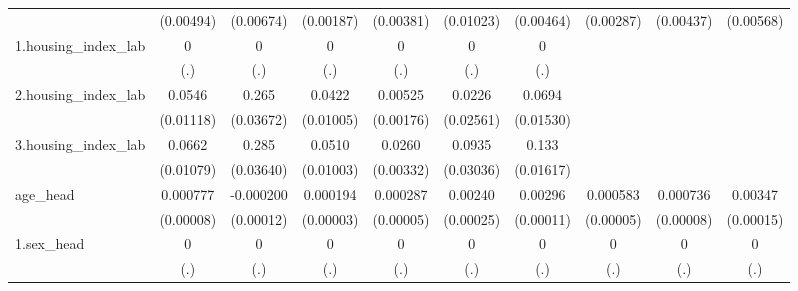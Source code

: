 \begin{table}[htbp]
\begin{tabular}{l*{9}{c}}
            &   (0.00494)         &   (0.00674)         &   (0.00187)         &   (0.00381)         &   (0.01023)         &   (0.00464)         &   (0.00287)         &   (0.00437)         &   (0.00568)         \\
1.housing\_index\_lab&           0         &           0         &           0         &           0         &           0         &           0         &                     &                     &                     \\
            &         (.)         &         (.)         &         (.)         &         (.)         &         (.)         &         (.)         &                     &                     &                     \\
2.housing\_index\_lab&      0.0546\sym{***}&       0.265\sym{***}&      0.0422\sym{***}&     0.00525\sym{***}&      0.0226         &      0.0694\sym{***}&                     &                     &                     \\
            &   (0.01118)         &   (0.03672)         &   (0.01005)         &   (0.00176)         &   (0.02561)         &   (0.01530)         &                     &                     &                     \\
3.housing\_index\_lab&      0.0662\sym{***}&       0.285\sym{***}&      0.0510\sym{***}&      0.0260\sym{***}&      0.0935\sym{***}&       0.133\sym{***}&                     &                     &                     \\
            &   (0.01079)         &   (0.03640)         &   (0.01003)         &   (0.00332)         &   (0.03036)         &   (0.01617)         &                     &                     &                     \\
age\_head    &    0.000777\sym{***}&   -0.000200\sym{*}  &    0.000194\sym{***}&    0.000287\sym{***}&     0.00240\sym{***}&     0.00296\sym{***}&    0.000583\sym{***}&    0.000736\sym{***}&     0.00347\sym{***}\\
            &   (0.00008)         &   (0.00012)         &   (0.00003)         &   (0.00005)         &   (0.00025)         &   (0.00011)         &   (0.00005)         &   (0.00008)         &   (0.00015)         \\
1.sex\_head  &           0         &           0         &           0         &           0         &           0         &           0         &           0         &           0         &           0         \\
            &         (.)         &         (.)         &         (.)         &         (.)         &         (.)         &         (.)         &         (.)         &         (.)         &         (.)         \\

\end{tabular}
\end{table}
